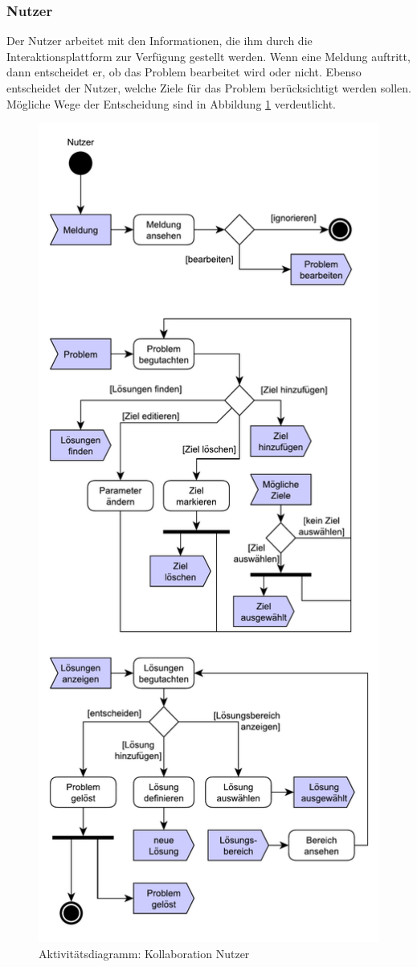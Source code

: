 \subsubsection*{Nutzer}
Der Nutzer arbeitet mit den Informationen, die ihm durch die Interaktionsplattform zur Verfügung gestellt werden. Wenn eine Meldung auftritt, dann entscheidet er, ob das Problem bearbeitet wird oder nicht. Ebenso entscheidet der Nutzer, welche Ziele für das Problem berücksichtigt werden sollen. Mögliche Wege der Entscheidung sind in Abbildung \ref{pic:Kollaboration-Nutzer} verdeutlicht.
\begin{figure}[htbp]
\centering
\includegraphics[scale=0.5]{Da_files/UML/Konzept/Aktivitaetsdiagramm-Nutzer.pdf}
\caption{Aktivitätsdiagramm: Kollaboration Nutzer}
\label{pic:Kollaboration-Nutzer}
\end{figure}

